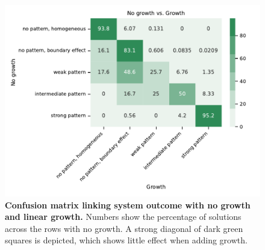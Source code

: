 \begin{figure}[H] %
    \centering
    \begin{adjustbox}{center}
        \includegraphics[width=1\textwidth]{chapters/Chapter 1/openboundary_edgegrowth2_confusion_variant0-11-12} %
    \end{adjustbox}
    \caption{\textbf{Confusion matrix linking system outcome with no growth and linear growth.} Numbers show the percentage of solutions across the rows with no growth. A strong diagonal of dark green squares is depicted, which shows little effect when adding growth.}
    \label{fig:openboundary_edgegrowth2_confusion_variant0} %
\end{figure}


